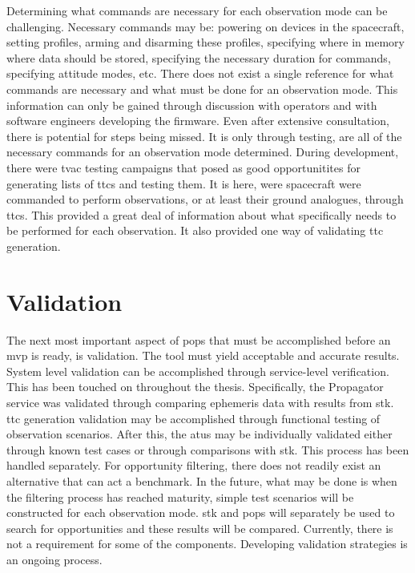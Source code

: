 Determining what commands are necessary for each observation mode can be
challenging.  Necessary commands may be: powering on devices in the spacecraft,
setting profiles, arming and disarming these profiles, specifying where in
memory where data should be stored, specifying the necessary duration for
commands, specifying attitude modes, etc.  There does not exist a single
reference for what commands are necessary and what must be done for an
observation mode. This information can only be gained through discussion with
operators and with software engineers developing the firmware.  Even after
extensive consultation, there is potential for steps being missed. It is only
through testing, are all of the necessary commands for an observation mode
determined. During development, there were \gls{tvac} testing campaigns
that posed as good opportunitites for generating lists of \glspl{ttc} and
testing them.  It is here, were spacecraft were commanded to perform
observations, or at least their ground analogues, through \glspl{ttc}.  This
provided a great deal of information about what specifically needs to be
performed for each observation. It also provided one way of validating
\gls{ttc} generation. 


\section{Validation}

The next most important aspect of \gls{pops} that must be accomplished before
an \gls{mvp} is ready, is validation. The tool must yield acceptable and
accurate results. System level validation can be accomplished through
service-level verification. This has been touched on throughout the thesis.
Specifically, the Propagator service was validated through comparing ephemeris
data with results from \gls{stk}. \gls{ttc} generation validation may be
accomplished through functional testing of observation scenarios. After this,
the \glspl{atu} may be individually validated either through known test cases
or through comparisons with \gls{stk}. This process has been handled
separately.  For opportunity filtering, there does not readily exist an
alternative that can act a benchmark. In the future, what may be done is when
the filtering process has reached maturity, simple test scenarios will be
constructed for each observation mode.  \gls{stk} and \gls{pops} will
separately be used to search for opportunities and these results will be
compared. Currently, there is not a requirement for some of the components.
Developing validation strategies is an ongoing process.

